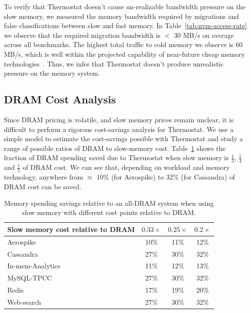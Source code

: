To verify that Thermostat doesn't cause un-realizable bandwidth pressure on the
slow memory, we measured the memory bandwidth required by migrations and false
classifications between slow and fast memory.  In
Table~\ref{tab:nvm-access-rate} we observe that the required migration bandwidth
is $<$ 30 MB/s on average across all benchmarks.  The highest total traffic to
cold memory we observe is 60 MB/s, which is well within the projected capability
of near-future cheap memory technologies~\cite{ref:Dulloor:datatiering}. Thus,
we infer that Thermostat doesn't produce unrealistic pressure on the memory
system.

\subsection{DRAM Cost Analysis}
\label{dram-cost}
Since DRAM pricing is volatile, and slow memory prices remain unclear, it is difficult
to perform a rigorous cost-savings analysis for Thermostat.  We use a simple
model to estimate the cost-savings possible with Thermostat and study a range of 
possible ratios of DRAM to slow-memory cost.
Table~\ref{tab:cost-analysis} shows the fraction of DRAM spending
saved due to Thermostat when slow memory is $\frac{1}{3}$, $\frac{1}{4}$ and
$\frac{1}{5}$ of DRAM cost. We can see that, depending on workload and memory
technology, anywhere from $\approx$ 10\% (for Aerospike) to 32\% (for Cassandra)
of DRAM cost can be saved.

\begin{table}
\begin{center}
\begin{tabular}{|p{}|c|c|c|}
\hline
Slow memory cost relative to DRAM&$0.33\times$& $0.25\times$ & $0.2\times$\\
\hline
Aerospike & 10\% & 11\% & 12\% \\
\hline
Cassandra & 27\% & 30\% & 32\% \\
\hline
In-mem-Analytics & 11\% & 12\% & 13\% \\
\hline
MySQL-TPCC & 27\% & 30\% & 32\% \\
\hline
Redis & 17\% & 19\% & 20\% \\
\hline
Web-search & 27\% & 30\% & 32\% \\
\hline
\end{tabular}
\caption{Memory spending savings relative to an all-DRAM system when using slow
memory with different cost points relative to DRAM.}
\label{tab:cost-analysis}
\end{center}
\vspace{-0.15in}
\end{table}

